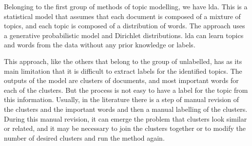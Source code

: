 Belonging to the first group of methods of topic modelling, we have \acrfull{lda}.
%
%
%
This is a statistical model that assumes that each document is composed of a mixture of topics, and each topic is composed of a distribution of words.
The approach uses a generative probabilistic model and Dirichlet distributions.
\acrshort{lda} can learn topics and words from the data without any prior knowledge or labels.




This approach, like the others that belong to the group of unlabelled, has as its main limitation that it is difficult to extract labels for the identified topics.
The outputs of the model are clusters of documents, and most important words for each of the clusters. But the process is not easy to have a label for the topic from this information. Usually, in the literature there is a step of manual revision of the clusters and the important words and then a manual labelling of the clusters.
During this manual revision, it can emerge the problem that clusters look similar or related, and it may be necessary to join the clusters together or to modify the number of desired clusters and run the method again.

